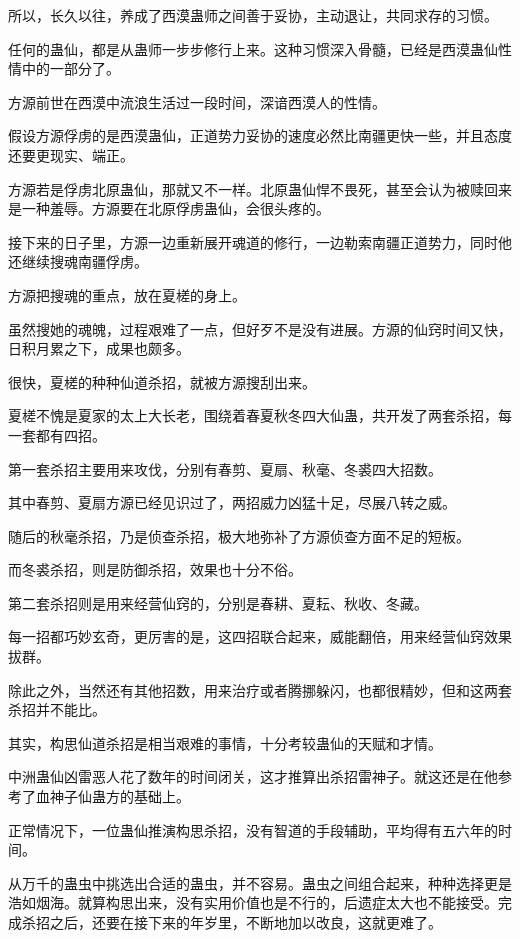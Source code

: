 \begin{this_body}
所以，长久以往，养成了西漠蛊师之间善于妥协，主动退让，共同求存的习惯。

任何的蛊仙，都是从蛊师一步步修行上来。这种习惯深入骨髓，已经是西漠蛊仙性情中的一部分了。

方源前世在西漠中流浪生活过一段时间，深谙西漠人的性情。

假设方源俘虏的是西漠蛊仙，正道势力妥协的速度必然比南疆更快一些，并且态度还要更现实、端正。

方源若是俘虏北原蛊仙，那就又不一样。北原蛊仙悍不畏死，甚至会认为被赎回来是一种羞辱。方源要在北原俘虏蛊仙，会很头疼的。

接下来的日子里，方源一边重新展开魂道的修行，一边勒索南疆正道势力，同时他还继续搜魂南疆俘虏。

方源把搜魂的重点，放在夏槎的身上。

虽然搜她的魂魄，过程艰难了一点，但好歹不是没有进展。方源的仙窍时间又快，日积月累之下，成果也颇多。

很快，夏槎的种种仙道杀招，就被方源搜刮出来。

夏槎不愧是夏家的太上大长老，围绕着春夏秋冬四大仙蛊，共开发了两套杀招，每一套都有四招。

第一套杀招主要用来攻伐，分别有春剪、夏扇、秋毫、冬裘四大招数。

其中春剪、夏扇方源已经见识过了，两招威力凶猛十足，尽展八转之威。

随后的秋毫杀招，乃是侦查杀招，极大地弥补了方源侦查方面不足的短板。

而冬裘杀招，则是防御杀招，效果也十分不俗。

第二套杀招则是用来经营仙窍的，分别是春耕、夏耘、秋收、冬藏。

每一招都巧妙玄奇，更厉害的是，这四招联合起来，威能翻倍，用来经营仙窍效果拔群。

除此之外，当然还有其他招数，用来治疗或者腾挪躲闪，也都很精妙，但和这两套杀招并不能比。

其实，构思仙道杀招是相当艰难的事情，十分考较蛊仙的天赋和才情。

中洲蛊仙凶雷恶人花了数年的时间闭关，这才推算出杀招雷神子。就这还是在他参考了血神子仙蛊方的基础上。

正常情况下，一位蛊仙推演构思杀招，没有智道的手段辅助，平均得有五六年的时间。

从万千的蛊虫中挑选出合适的蛊虫，并不容易。蛊虫之间组合起来，种种选择更是浩如烟海。就算构思出来，没有实用价值也是不行的，后遗症太大也不能接受。完成杀招之后，还要在接下来的年岁里，不断地加以改良，这就更难了。


\end{this_body}
